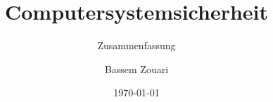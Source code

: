 \documentclass[
    ngerman,
    color=2b,
    loadcommon, %
    summary,
    boxarc,
    main,
]{rubos-tuda-template}
\title[CSS]{Computersystemsicherheit}
\subtitle{Zusammenfassung}
\author{Bassem Zouari}
\date{\today}
\begin{document}
\maketitle{}
\tableofcontents %
\clearpage

%    
%
%

\clearpage

\clearpage

\clearpage

\clearpage

\clearpage

\clearpage

\clearpage

\end{document}
